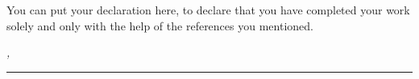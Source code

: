 
\label{sec:declaration}
\thispagestyle{empty}

You can put your declaration here, to declare that you have completed your work solely and only with the help of the references you mentioned.

\bigskip

\noindent\textit{\thesisUniversityCity, \thesisDate}

\smallskip

\begin{flushright}
	\begin{minipage}{5cm}
		\rule{\textwidth}{1pt}
		\centering\thesisName
	\end{minipage}
\end{flushright}

